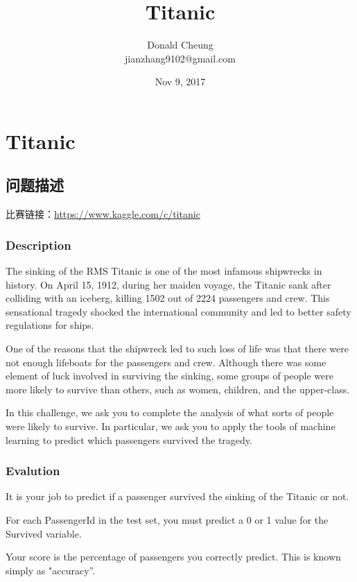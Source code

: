 \documentclass[10pt,a4paper]{ctexbook}
\begin{document}
    \setlength{\baselineskip}{20pt}
    \title{Titanic}
    \author{Donald Cheung\\jianzhang9102@gmail.com}
    \date{Nov 9, 2017}
    \tableofcontents
\fi

\chapter{Titanic}

\section{问题描述}
比赛链接：\url{https://www.kaggle.com/c/titanic}

\subsection{Description}
The sinking of the RMS Titanic is one of the most infamous shipwrecks in history. On April 15, 1912, during her maiden voyage, the Titanic sank after colliding with an iceberg, killing 1502 out of 2224 passengers and crew. This sensational tragedy shocked the international community and led to better safety regulations for ships.

One of the reasons that the shipwreck led to such loss of life was that there were not enough lifeboats for the passengers and crew. Although there was some element of luck involved in surviving the sinking, some groups of people were more likely to survive than others, such as women, children, and the upper-class.

In this challenge, we ask you to complete the analysis of what sorts of people were likely to survive. In particular, we ask you to apply the tools of machine learning to predict which passengers survived the tragedy.

\subsection{Evalution}
It is your job to predict if a passenger survived the sinking of the Titanic or not. 

For each PassengerId in the test set, you must predict a 0 or 1 value for the Survived variable.

Your score is the percentage of passengers you correctly predict. This is known simply as "accuracy”.
\end{document}
